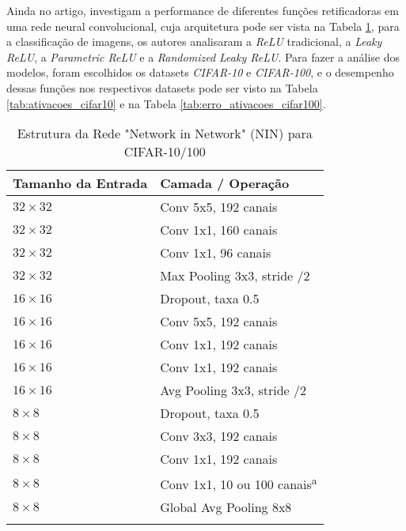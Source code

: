 Ainda no artigo, \textcite{XuRReLU} investigam a performance de diferentes funções retificadoras em uma rede neural convolucional, cuja arquitetura pode ser vista na Tabela \ref{tab:nin_arquitetura}, para a classificação de imagens, os autores analisaram a \textit{ReLU} tradicional, a \textit{Leaky ReLU}, a \textit{Parametric ReLU} e a \textit{Randomized Leaky ReLU}. Para fazer a análise dos modelos, foram escolhidos os datasets \textit{CIFAR-10} e \textit{CIFAR-100}, e o desempenho dessas funções nos respectivos datasets pode ser visto na Tabela \ref{tab:ativacoes_cifar10} e na Tabela \ref{tab:erro_ativacoes_cifar100}.

\begin{table}[ht]
    \centering
    \begin{threeparttable}
        \caption{Estrutura da Rede "Network in Network" (NIN) para CIFAR-10/100}
        \label{tab:nin_arquitetura}
        \begin{tabular}{ll}
            \toprule
            \textbf{Tamanho da Entrada} & \textbf{Camada / Operação} \\
            \midrule
            
            $32 \times 32$ & Conv 5x5, 192 canais \\
            $32 \times 32$ & Conv 1x1, 160 canais \\
            $32 \times 32$ & Conv 1x1, 96 canais \\
            $32 \times 32$ & Max Pooling 3x3, stride /2 \\
            \addlinespace %
            
            $16 \times 16$ & Dropout, taxa 0.5 \\
            $16 \times 16$ & Conv 5x5, 192 canais \\
            $16 \times 16$ & Conv 1x1, 192 canais \\
            $16 \times 16$ & Conv 1x1, 192 canais \\
            $16 \times 16$ & Avg Pooling 3x3, stride /2 \\
            \addlinespace
            
            $8 \times 8$ & Dropout, taxa 0.5 \\
            $8 \times 8$ & Conv 3x3, 192 canais \\
            $8 \times 8$ & Conv 1x1, 192 canais \\
            $8 \times 8$ & Conv 1x1, 10 ou 100 canais\textsuperscript{a} \\
            $8 \times 8$ & Global Avg Pooling 8x8 \\
            \addlinespace
            

\end{tabular}
\end{threeparttable}
\end{table}
